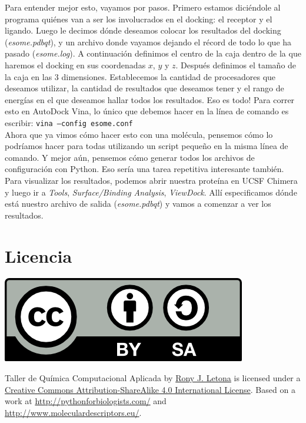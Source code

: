 \documentclass[10pt,letterpaper]{article}
\newcommand{\inlinecode}[1]{
\colorbox{light-gray}{\texttt{#1}}
}
\begin{document}
Para entender mejor esto, vayamos por pasos. Primero estamos dici\'endole al programa qui\'enes van a ser los involucrados en el docking: el receptor y el ligando. Luego le decimos d\'onde deseamos colocar los resultados del docking (\emph{esome.pdbqt}), y un archivo donde vayamos dejando el r\'ecord de todo lo que ha pasado (\emph{esome.log}). A continuaci\'on definimos el centro de la caja dentro de la que haremos el docking en sus coordenadas $x$, $y$ y $z$. Despu\'es definimos el tama\~no de la caja en las 3 dimensiones. Establecemos la cantidad de procesadores que deseamos utilizar, la cantidad de resultados que deseamos tener y el rango de energ\'ias en el que deseamos hallar todos los resultados. Eso es todo! Para correr esto en AutoDock Vina, lo \'unico que debemos hacer en la l\'inea de comando es escribir: \inlinecode{vina --config esome.conf}\\

Ahora que ya vimos c\'omo hacer esto con una mol\'ecula, pensemos c\'omo lo podr\'iamos hacer para todas utilizando un script peque\~no en la misma l\'inea de comando. Y mejor a\'un, pensemos c\'omo generar todos los archivos de configuraci\'on con Python. Eso ser\'ia una tarea repetitiva interesante tambi\'en.\\

Para visualizar los resultados, podemos abrir nuestra prote\'ina en UCSF Chimera y luego ir a \emph{Tools}, \emph{Surface/Binding Analysis}, \emph{ViewDock}. All\'i especificamos d\'onde est\'a nuestro archivo de salida (\emph{esome.pdbqt}) y vamos a comenzar a ver los resultados.

\section*{Licencia}

\noindent \includegraphics{img/cc_big.png}

\noindent Taller de Qu\'imica Computacional Aplicada by \href{http://github.com/zronyj/TQCA}{Rony J. Letona} is licensed under a \href{http://creativecommons.org/licenses/by-sa/4.0/}{Creative Commons Attribution-ShareAlike 4.0 International License}.
Based on a work at \url{http://pythonforbiologists.com/} and \url{http://www.moleculardescriptors.eu/}.
\end{document}
